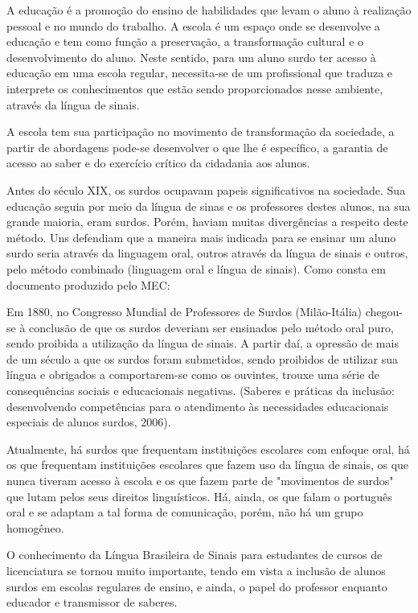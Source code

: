 \documentclass[brasil]{abnt}
\begin{document}
	A educação é a promoção do ensino de habilidades que levam o aluno à realização pessoal e no mundo do trabalho. 
	A escola é um espaço onde se desenvolve a educação e tem como função a preservação, a transformação cultural e o desenvolvimento do aluno. 
	Neste sentido, para um aluno surdo ter acesso à educação em uma escola regular, necessita-se de um profissional que traduza e interprete os conhecimentos que estão sendo proporcionados nesse ambiente, 
	através da língua de sinais.
	
	A escola tem sua participação no movimento de transformação da sociedade, a partir de abordagens pode-se desenvolver o que lhe é específico, a garantia de acesso 
	ao saber e do exercício crítico da cidadania aos alunos. 
	
	Antes do século XIX, os surdos ocupavam papeis significativos na sociedade. Sua educação seguia por meio da língua de sinas e os professores destes alunos, na sua grande maioria, eram surdos. Porém, 
	haviam muitas divergências a respeito deste método. Uns defendiam que a maneira mais indicada para se ensinar um aluno surdo seria através da linguagem oral, outros através da língua de sinais e outros, 
	pelo método combinado (linguagem oral e língua de sinais). Como consta em documento produzido pelo MEC:
		
		\begin{citacao} Em 1880, no Congresso Mundial de Professores de Surdos (Milão-Itália) 
						chegou-se à conclusão de que os surdos deveriam ser ensinados pelo método oral puro, sendo proibida a utilização da língua de sinais. A partir daí, a opressão de mais de 
						um século a que os surdos foram submetidos, sendo proibidos de utilizar sua língua e obrigados a comportarem-se como os ouvintes, trouxe uma série de consequências sociais 
						e educacionais negativas. (Saberes e práticas da inclusão: desenvolvendo competências para o atendimento às necessidades educacionais especiais de alunos surdos, 2006).
		\end{citacao}

	Atualmente, há surdos que frequentam instituições escolares com enfoque oral, há os que frequentam instituições escolares que fazem uso da língua de sinais, os que nunca tiveram acesso à escola e os 
	que fazem parte de "movimentos de surdos" que lutam pelos seus direitos linguísticos. Há, ainda, os que falam o português oral e se adaptam a tal forma de comunicação, porém, não há um grupo homogêneo. 	
	
	O conhecimento da Língua Brasileira de Sinais para estudantes de cursos de licenciatura se tornou muito importante, tendo em vista a inclusão de alunos surdos em escolas regulares de ensino, e ainda, o papel 
	do professor enquanto educador e transmissor de saberes.
	
\end{document}
